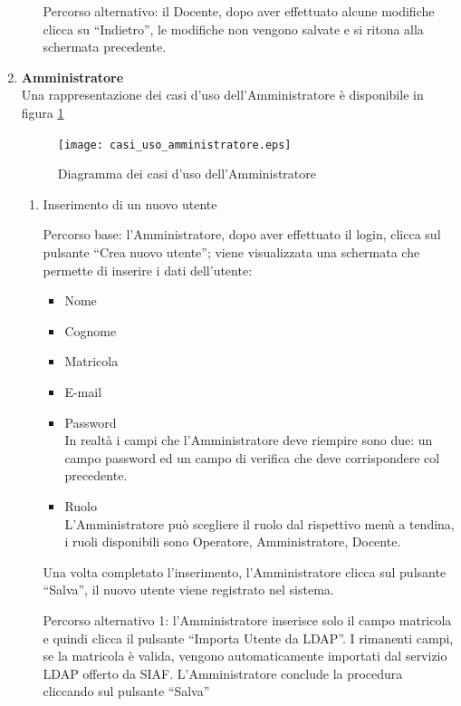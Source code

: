 \begin{enumerate}
\begin{enumerate}
 Percorso alternativo:
 il Docente, dopo aver effettuato alcune modifiche clicca su ``Indietro'', le modifiche non vengono salvate e si ritona alla schermata precedente.

 
\end{enumerate}



\item \textbf{Amministratore}\\
Una rappresentazione dei casi d'uso dell'Amministratore è disponibile in figura \ref{use_case_diag_admin}
\begin{figure}[h]
  \caption{Diagramma dei casi d'uso dell'Amministratore}
  \label{use_case_diag_admin}
  \centering
    \texttt{[image: casi\_uso\_amministratore.eps]}
\end{figure}


\begin{enumerate}
 \item Inserimento di un nuovo utente\\ \label{UC_new_user}
 
 
 Percorso base:
 l'Amministratore, dopo aver effettuato il login, clicca sul pulsante ``Crea nuovo utente''; viene visualizzata una schermata che permette
 di inserire i dati dell'utente:
 \begin{itemize}
  \item Nome
  \item Cognome
  \item Matricola
  \item E-mail
  \item	Password\\
    In realtà i campi che l'Amministratore deve riempire sono due: un campo password ed un campo di verifica che deve corrispondere col precedente.
  \item Ruolo\\
    L'Amministratore può scegliere il ruolo dal rispettivo menù a tendina, i ruoli disponibili sono Operatore, Amministratore, Docente.
 \end{itemize}
 
 Una volta completato l'inserimento, l'Amministratore clicca sul pulsante ``Salva'', il nuovo utente viene registrato nel sistema. 

 Percorso alternativo 1:
 l'Amministratore inserisce solo il campo matricola e quindi clicca il pulsante ``Importa Utente da LDAP''. I rimanenti campi, se la matricola è valida,
 vengono automaticamente importati dal servizio LDAP offerto da SIAF. L'Amministratore conclude la procedura cliccando sul pulsante ``Salva''
 

\end{enumerate}
\end{enumerate}
